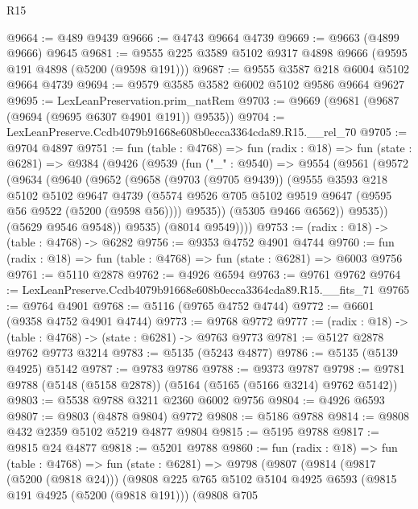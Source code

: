 \begin{lexlean}{R15}
\begin{coremodule}
{{{{{{{{{{{@9664 := @489 @9439
@9666 := @4743 @9664 @4739
@9669 := @9663 (@4899 @9666) @9645
@9681 := @9555 @225 @3589 @5102 @9317 @4898 @9666 (@9595 @191 @4898 (@5200 (@9598 @191)))
@9687 := @9555 @3587 @218 @6004 @5102 @9664 @4739
@9694 := @9579 @3585 @3582 @6002 @5102 @9586 @9664 @9627
@9695 := LexLeanPreservation.prim_natRem
@9703 := @9669 (@9681 (@9687 (@9694 (@9695 @6307 @4901 @191)) @9535))
@9704 := LexLeanPreserve.Ccdb4079b91668e608b0ecca3364cda89.R15.__rel_70
@9705 := @9704 @4897
@9751 := fun (table : @4768) =>
  fun (radix : @18) =>
  fun (state : @6281) =>
  @9384
    (@9426
      (@9539
        (fun ("_" : @9540) =>
        @9554
          (@9561
            (@9572
              (@9634
                (@9640
                  (@9652
                    (@9658
                      (@9703 (@9705 @9439))
                      (@9555
                        @3593
                        @218
                        @5102
                        @5102
                        @9647
                        @4739
                        (@5574 @9526 @705 @5102 @9519 @9647 (@9595 @56 @9522 (@5200 (@9598 @56))))
                        @9535))
                    (@5305 @9466 @6562))
                  @9535))
              (@5629 @9546 @9548))
            @9535)
          (@8014 @9549))))
@9753 := (radix : @18) -> (table : @4768) -> @6282
@9756 := @9353 @4752 @4901 @4744
@9760 := fun (radix : @18) => fun (table : @4768) => fun (state : @6281) => @6003 @9756
@9761 := @5110 @2878
@9762 := @4926 @6594
@9763 := @9761 @9762
@9764 := LexLeanPreserve.Ccdb4079b91668e608b0ecca3364cda89.R15.__fits_71
@9765 := @9764 @4901
@9768 := @5116 (@9765 @4752 @4744)
@9772 := @6601 (@9358 @4752 @4901 @4744)
@9773 := @9768 @9772
@9777 := (radix : @18) -> (table : @4768) -> (state : @6281) -> @9763 @9773
@9781 := @5127 @2878 @9762 @9773 @3214
@9783 := @5135 (@5243 @4877)
@9786 := @5135 (@5139 @4925) @5142
@9787 := @9783 @9786
@9788 := @9373 @9787
@9798 := @9781 @9788 (@5148 (@5158 @2878)) (@5164 (@5165 (@5166 @3214) @9762 @5142))
@9803 := @5538 @9788 @3211 @2360 @6002 @9756
@9804 := @4926 @6593
@9807 := @9803 (@4878 @9804) @9772
@9808 := @5186 @9788
@9814 := @9808 @432 @2359 @5102 @5219 @4877 @9804
@9815 := @5195 @9788
@9817 := @9815 @24 @4877
@9818 := @5201 @9788
@9860 := fun (radix : @18) =>
  fun (table : @4768) =>
  fun (state : @6281) =>
  @9798
    (@9807
      (@9814
        (@9817 (@5200 (@9818 @24)))
        (@9808
          @225
          @765
          @5102
          @5104
          @4925
          @6593
          (@9815 @191 @4925 (@5200 (@9818 @191)))
          (@9808
            @705
}}}}}}}}}}}
\end{coremodule}
\end{lexlean}
